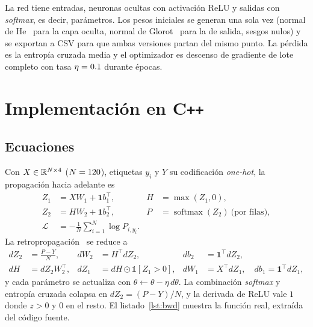 \documentclass[11pt,a4paper]{article}
\newcommand{\cpp}{C\texttt{++}\xspace}
\begin{document}
La red tiene \nFeatures{} entradas, \nHidden{} neuronas ocultas con activaci\'on ReLU y \nClasses{} salidas con \textit{softmax}, es decir, \nParams{} par\'ametros. Los pesos iniciales se generan una sola vez (normal de He~\cite{he2015} para la capa oculta, normal de Glorot~\cite{glorot2010} para la de salida, sesgos nulos) y se exportan a CSV para que ambas versiones partan del mismo punto. La p\'erdida es la entrop\'ia cruzada media y el optimizador es descenso de gradiente de lote completo con tasa $\eta=0.1$ durante \nEpochs{} \'epocas.

\section{Implementaci\'on en \cpp}
\subsection{Ecuaciones}
Con $X\in\mathbb{R}^{N\times 4}$ ($N=120$), etiquetas $y_i$ y $Y$ su codificaci\'on \textit{one-hot}, la propagaci\'on hacia adelante es
\begin{align}
Z_1 &= XW_1+\mathbf{1}b_1^\top, & H &= \max(Z_1,0), \nonumber\\
Z_2 &= HW_2+\mathbf{1}b_2^\top, & P &= \operatorname{softmax}(Z_2)\ \text{(por filas)},\label{eq:fwd}\\
\mathcal{L} &= -\frac1N\sum_{i=1}^{N}\log P_{i,y_i}. \nonumber
\end{align}
La retropropagaci\'on~\cite{rumelhart1986,goodfellow2016} se reduce a
\begin{align}
dZ_2 &= \frac{P-Y}{N}, & dW_2 &= H^\top dZ_2, & db_2 &= \mathbf{1}^\top dZ_2,\nonumber\\
dH &= dZ_2W_2^\top, & dZ_1 &= dH\odot\mathbb{1}[Z_1>0], & dW_1 &= X^\top dZ_1,\quad db_1=\mathbf{1}^\top dZ_1,\label{eq:bwd}
\end{align}
y cada par\'ametro se actualiza con $\theta\leftarrow\theta-\eta\,d\theta$. La combinaci\'on \textit{softmax} y entrop\'ia cruzada colapsa en $dZ_2=(P-Y)/N$, y la derivada de ReLU vale $1$ donde $z>0$ y $0$ en el resto. El listado~\ref{lst:bwd} muestra la funci\'on real, extra\'ida del c\'odigo fuente.


\end{document}
